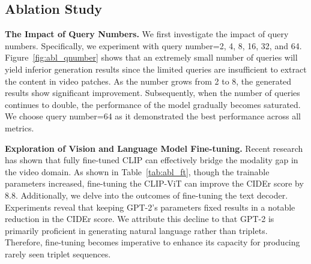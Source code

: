 \documentclass[letterpaper]{article}
\begin{document}
\subsection{Ablation Study}
\noindent \textbf{The Impact of Query Numbers. }
We first investigate the impact of query numbers.
Specifically, we experiment with query number=2, 4, 8, 16, 32, and 64.
Figure~\ref{fig:abl_qnumber} shows that an extremely small number of queries will yield inferior generation results since the limited queries are insufficient to extract the content in video patches.
 As the number grows from 2 to 8, the generated results show significant improvement.
 Subsequently, when the number of queries continues to double, the performance of the model gradually becomes saturated. We choose query number=64 as it demonstrated the best performance across all metrics.

\noindent \textbf{Exploration of Vision and Language Model Fine-tuning.}
Recent research~\cite{Rasheed2023vificlip} has shown that fully fine-tuned CLIP can effectively bridge the modality gap in the video domain.
As shown in Table~\ref{tab:abl_ft}, though the trainable parameters increased, fine-tuning the CLIP-ViT can improve the CIDEr score by 8.8.
Additionally, we delve into the outcomes of fine-tuning the text decoder. Experiments reveal that keeping GPT-2's parameters fixed results in a notable reduction in the CIDEr score. We attribute this decline to that GPT-2 is primarily proficient in generating natural language rather than triplets. Therefore, fine-tuning becomes imperative to enhance its capacity for producing rarely seen triplet sequences.
\end{document}
